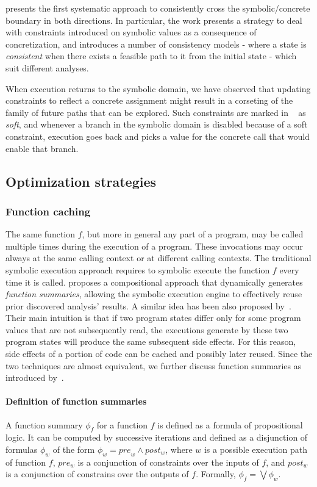 \cite{CKC-TOCS12} presents the first systematic approach to consistently cross the symbolic/concrete boundary in both directions. In particular, the work presents a strategy to deal with constraints introduced on symbolic values as a consequence of concretization, and introduces a number of consistency models - where a state is {\em consistent} when there exists a feasible path to it from the initial state - which suit different analyses.

When execution returns to the symbolic domain, we have observed that updating constraints to reflect a concrete assignment might result in a corseting of the family of future paths that can be explored. Such constraints are marked in ~\cite{CKC-TOCS12} as {\em soft}, and whenever a branch in the symbolic domain is disabled because of a soft constraint, execution goes back and picks a value for the concrete call that would enable that branch.

\subsection{Optimization strategies} 

\subsubsection{Function caching} The same function $f$, but more in general any part of a program, may be called multiple times during the execution of a program. These invocations may occur always at the same calling context or at different calling contexts. The traditional symbolic execution approach requires to symbolic execute the function $f$ every time it is called. \cite{G-POPL07} proposes a compositional approach that dynamically generates {\em function summaries}, allowing the symbolic execution engine to effectively reuse prior discovered analysis' results. A similar idea has been also proposed by~\cite{BCE-TACAS08}. Their main intuition is that if two program states differ only for some program values that are not subsequently read, the executions generate by these two program states will produce the same subsequent side effects. For this reason, side effects of a portion of code can be cached and possibly later reused. Since the two techniques are almost equivalent, we further discuss function summaries as introduced by~\cite{G-POPL07}.

\paragraph{Definition of function summaries} A function summary $\phi_f$ for a function $f$ is defined as a formula of propositional logic. It can be computed by successive iterations and defined as a disjunction of formulas $\phi_w$ of the form $\phi_w = {pre}_w \wedge post_w$, where $w$ is a possible execution path of function $f$, $pre_w$ is a conjunction of constraints over the inputs of $f$, and $post_w$ is a conjunction of constrains over the outputs of $f$. Formally, $\phi_f = \bigvee \phi_w$.  

